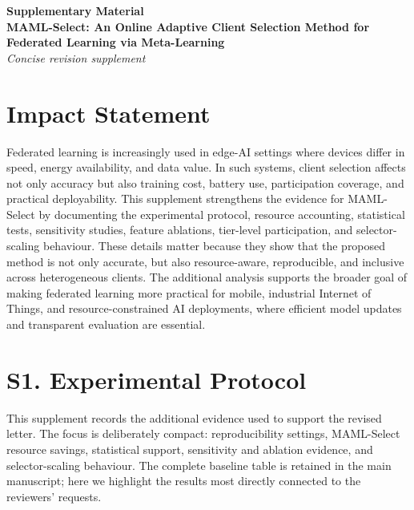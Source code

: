 \documentclass[10pt]{article}
\begin{document}
\begin{center}
{\Large \textbf{Supplementary Material}}\\[0.35em]
{\large \textbf{MAML-Select: An Online Adaptive Client Selection Method for Federated Learning via Meta-Learning}}\\[0.25em]
{\normalsize \textit{Concise revision supplement}}
\end{center}

\section*{Impact Statement}

Federated learning is increasingly used in edge-AI settings where devices differ in speed, energy availability, and data value. In such systems, client selection affects not only accuracy but also training cost, battery use, participation coverage, and practical deployability. This supplement strengthens the evidence for MAML-Select by documenting the experimental protocol, resource accounting, statistical tests, sensitivity studies, feature ablations, tier-level participation, and selector-scaling behaviour. These details matter because they show that the proposed method is not only accurate, but also resource-aware, reproducible, and inclusive across heterogeneous clients. The additional analysis supports the broader goal of making federated learning more practical for mobile, industrial Internet of Things, and resource-constrained AI deployments, where efficient model updates and transparent evaluation are essential.

\section*{S1. Experimental Protocol}

This supplement records the additional evidence used to support the revised letter.  The focus is deliberately compact: reproducibility settings, MAML-Select resource savings, statistical support, sensitivity and ablation evidence, and selector-scaling behaviour.  The complete baseline table is retained in the main manuscript; here we highlight the results most directly connected to the reviewers' requests.
\end{document}
